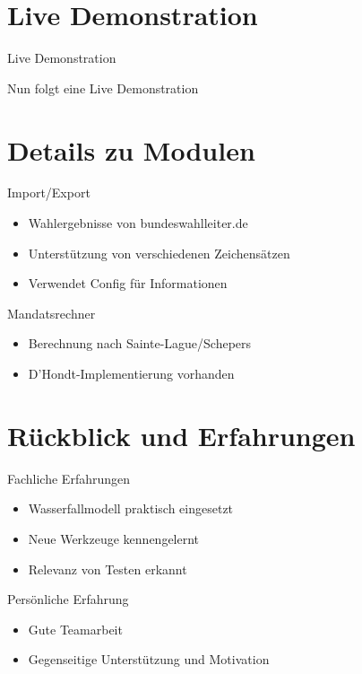 \documentclass[18pt]{beamer}
\begin{document}
\section{Live Demonstration}
\begin{frame}{Live Demonstration}
\begin{LARGE}
\begin{center}
	Nun folgt eine Live Demonstration
\end{center}
\end{LARGE}
\end{frame}


\section{Details zu Modulen}
\begin{frame}{Import/Export}
\begin{itemize}
	\item Wahlergebnisse von bundeswahlleiter.de
	\item Unterstützung von verschiedenen Zeichensätzen
	\item Verwendet Config für Informationen
\end{itemize}
\end{frame}


\begin{frame}{Mandatsrechner}
\begin{itemize}
	\item Berechnung nach Sainte-Lague/Schepers
	\item D'Hondt-Implementierung vorhanden
\end{itemize}
\end{frame}

\section{Rückblick und Erfahrungen}
\begin{frame}{Fachliche Erfahrungen}
\begin{itemize}
	\item Wasserfallmodell praktisch eingesetzt
	\item Neue Werkzeuge kennengelernt
	\item Relevanz von Testen erkannt
\end{itemize}
\end{frame}

\begin{frame}{Persönliche Erfahrung}
\begin{itemize}
	\item Gute Teamarbeit
	\item Gegenseitige Unterstützung und Motivation
\end{itemize}
\end{frame}
\end{document}
